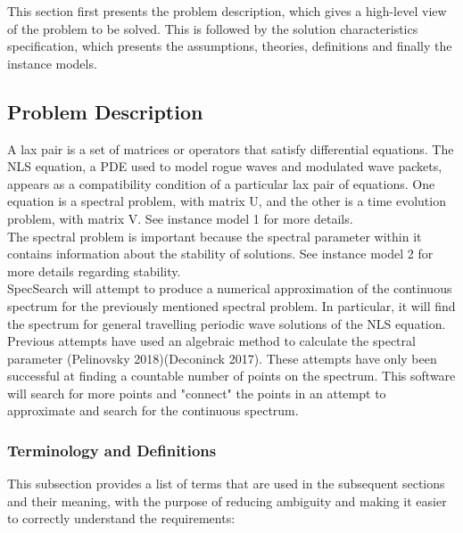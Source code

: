 \documentclass[12pt]{article}
\begin{document}
This section first presents the problem description, which gives a high-level
view of the problem to be solved.  This is followed by the solution 
characteristics specification, which presents the assumptions, theories, 
definitions and finally the instance models. 

\subsection{Problem Description} \label{Sec_pd}
A lax pair is a set of matrices or operators that satisfy differential 
equations. The NLS equation, a PDE used to model rogue waves and modulated wave 
packets, appears as a compatibility condition of a particular lax pair of 
equations. One equation is a spectral problem, with matrix U, and the other is 
a time evolution problem, with matrix V. See instance model 1 for more 
details.\\

 The 
spectral problem is important because the spectral 
parameter within it contains information about the stability of solutions. See 
instance model 2 for more details regarding stability.\\

SpecSearch will attempt to produce a numerical approximation of the continuous 
spectrum for the previously mentioned spectral problem. In particular, 
it will find the spectrum for general travelling periodic wave solutions of the 
NLS equation. \\ 

Previous attempts have used an algebraic method to calculate the spectral 
parameter (Pelinovsky 2018)(Deconinck 2017). These attempts have only been 
successful at finding a countable number of points on the spectrum. This 
software will 
search for more points and "connect" the points in an attempt to approximate 
and search for the continuous spectrum. 
\\ 

\subsubsection{Terminology and  Definitions}

This subsection provides a list of terms that are used in the subsequent
sections and their meaning, with the purpose of reducing ambiguity and making it
easier to correctly understand the requirements:
\end{document}
